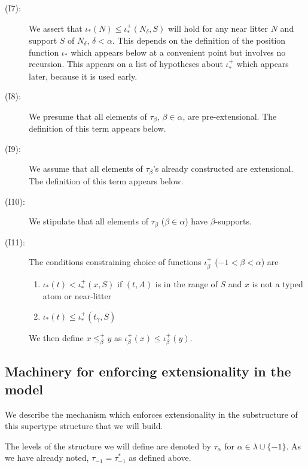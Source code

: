 \documentclass[112pt]{article}
\begin{document}
\begin{description}
\item[(I7):]  We assert that $\iota_*(N) \leq \iota_*^+(N_\delta,S)$ will hold for any near litter $N$ and support $S$ of $N_\delta$, $\delta<\alpha$.  This depends on the definition
of the position function $\iota_*$ which appears below at a convenient point but involves no recursion.  This appears on a list of hypotheses about $\iota_*^+$ which appears later, because it is used early.

\item[(I8):]  We presume that all elements of $\tau_\beta$, $\beta\in \alpha$, are pre-extensional.   The definition of this term appears below.

\item[(I9):]  We assume that all elements of $\tau_\beta$'s already constructed are extensional.  The definition of this term appears below.

\item[(I10):]  We stipulate that all elements of $\tau_\beta$ ($\beta\in\alpha$) have $\beta$-supports.

\item[(I11):]  The conditions constraining choice of functions $\iota^+_\beta$ ($-1 < \beta < \alpha$) are

\begin{enumerate}

\item $\iota_*(t) < \iota^+_*(x,S)$ if $(t,A)$ is in the range of $S$ and $x$ is not a typed atom or near-litter

\item $\iota_*(t) \leq \iota^+_*(t_\gamma,S)$

\end{enumerate}

We then define $x \leq^+_\beta y$ as $\iota^+_\beta(x) \leq \iota^+_\beta(y)$.

\end{description}



\subsection{Machinery for enforcing extensionality in the model}
  We describe the mechanism which enforces extensionality in the substructure of this supertype structure that we will build.

The levels of the structure we will define are denoted by $\tau_\alpha$ for \newline $\alpha \in \lambda \cup \{-1\}$.  As we have already noted, $\tau_{-1}=\tau^*_{-1}$ as defined above.
\end{document}
